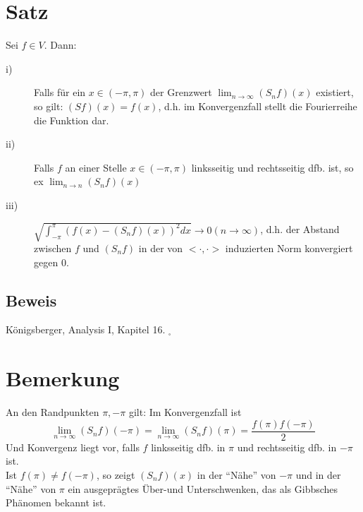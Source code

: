 \documentclass{scrbook}
\begin{document}
\section{Satz}
Sei $f\in V$. Dann:
\begin{description}
\item[i)] Falls für ein $x \in (-\pi,\pi)$ der Grenzwert $\lim_{n\to \infty}(S_nf)(x)$ existiert, so gilt: $(Sf)(x) = f(x)$, d.h. im Konvergenzfall stellt die Fourierreihe die Funktion dar.
\item[ii)] Falls $f$ an einer Stelle $x \in (-\pi , \pi)$ linksseitig und rechtsseitig dfb. ist, so ex $\lim_{n \to n} (S_nf)(x)$
\item[iii)] $\sqrt{\int^\pi_{-\pi} (f(x)-(S_nf)(x))^2dx} \to 0 (n\to \infty)$, d.h. der Abstand zwischen $f$ und $(S_nf)$ in der von $< \cdot, \cdot>$ induzierten Norm konvergiert gegen 0.
\end{description}
\subsection*{Beweis}
Königsberger, Analysis I, Kapitel 16. $_\square$
\section{Bemerkung}
An den Randpunkten $\pi, -\pi$ gilt: Im Konvergenzfall ist
\[\lim_{n \to \infty}(S_nf)(-\pi) = \lim_{n \to \infty}(S_nf)(\pi)=\frac{f(\pi)f(-\pi)}{2}\]
Und Konvergenz liegt vor, falls $f$ linksseitig dfb. in $\pi$ und rechtsseitig dfb. in $- \pi$ ist.\\Ist $f(\pi) \neq f(-\pi)$, so zeigt $(S_nf)(x)$ in der "`Nähe"' von $-\pi$ und in der "`Nähe"' von $\pi$ ein ausgeprägtes Über-und Unterschwenken, das als Gibbsches Phänomen bekannt ist.
\end{document}

